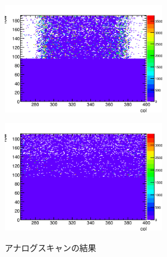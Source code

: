 \begin{figure}[h]
  \centering
  \begin{minipage}[b]{0.45\linewidth}
    \centering
    \includegraphics[width=7cm]{./figure/AnalogScan.png}
    \label{fig:analog1}
  \end{minipage}
  \begin{minipage}[b]{0.45\linewidth}
    \centering
    \includegraphics[width=7cm]{./figure/AnalogScan3.png}
    \label{fig:analog2}
  \end{minipage}
  \caption{アナログスキャンの結果}
  \label{fig:analog}
\end{figure}


